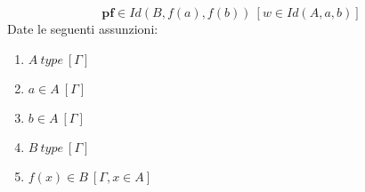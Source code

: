 \begin{displaymath}
    \textbf{pf} \in Id(B, f(a), f(b))\ [w \in Id(A, a, b)]
\end{displaymath}
Date le seguenti assunzioni:
\begin{enumerate}[label=$\pi_{\arabic*}$)]
    \item $A\ type\ [\Gamma]$
    \item $a \in A\ [\Gamma]$
    \item $b \in A\ [\Gamma]$
    \item $B\ type\ [\Gamma]$
    \item $f(x) \in B\ [\Gamma, x \in A]$
\end{enumerate}